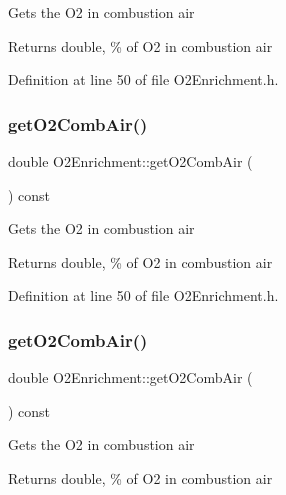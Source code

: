 Gets the O2 in combustion air \begin{DoxyReturn}{Returns}
double, \% of O2 in combustion air 
\end{DoxyReturn}


Definition at line 50 of file O2\+Enrichment.\+h.

\mbox{\label{class_o2_enrichment_a52953d4a55fd9e4d91030fe96d800f71}} 
\subsubsection{\texorpdfstring{get\+O2\+Comb\+Air()}{getO2CombAir()}\hspace{0.1cm}{\footnotesize\ttfamily [2/3]}}
{\footnotesize\ttfamily double O2\+Enrichment\+::get\+O2\+Comb\+Air (\begin{DoxyParamCaption}{ }\end{DoxyParamCaption}) const\hspace{0.3cm}{\ttfamily [inline]}}

Gets the O2 in combustion air \begin{DoxyReturn}{Returns}
double, \% of O2 in combustion air 
\end{DoxyReturn}


Definition at line 50 of file O2\+Enrichment.\+h.

\mbox{\label{class_o2_enrichment_a52953d4a55fd9e4d91030fe96d800f71}} 
\subsubsection{\texorpdfstring{get\+O2\+Comb\+Air()}{getO2CombAir()}\hspace{0.1cm}{\footnotesize\ttfamily [3/3]}}
{\footnotesize\ttfamily double O2\+Enrichment\+::get\+O2\+Comb\+Air (\begin{DoxyParamCaption}{ }\end{DoxyParamCaption}) const\hspace{0.3cm}{\ttfamily [inline]}}

Gets the O2 in combustion air \begin{DoxyReturn}{Returns}
double, \% of O2 in combustion air 
\end{DoxyReturn}



